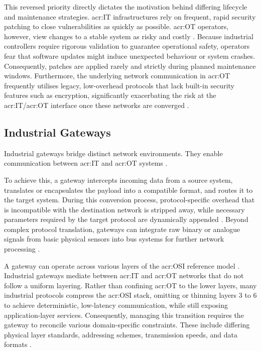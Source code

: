 This reversed priority directly dictates the motivation behind differing lifecycle and maintenance strategies. \gls{acr:IT} infrastructures rely on frequent, rapid security patching to close vulnerabilities as quickly as possible. \gls{acr:OT} operators, however, view changes to a stable system as risky and costly \cite{orise2025itotconvergence}. Because industrial controllers require rigorous validation to guarantee operational safety, operators fear that software updates might induce unexpected behaviour or system crashes. Consequently, patches are applied rarely and strictly during planned maintenance windows. Furthermore, the underlying network communication in \gls{acr:OT} frequently utilises legacy, low-overhead protocols that lack built-in security features such as encryption, significantly exacerbating the risk at the \gls{acr:IT}/\gls{acr:OT} interface once these networks are converged \cite{hwi_ot_definition}.

\subsection{Industrial Gateways} 
\label{subsec:architectural_role_gateways}

Industrial gateways bridge distinct network environments. They enable communication between \gls{acr:IT} and \gls{acr:OT} systems \cite{elektronikkompendium_gateway}.

To achieve this, a gateway intercepts incoming data from a source system, translates or encapsulates the payload into a compatible format, and routes it to the target system. During this conversion process, protocol-specific overhead that is incompatible with the destination network is stripped away, while necessary parameters required by the target protocol are dynamically appended \cite[p. 277]{Gsell2026}.
Beyond complex protocol translation, gateways can integrate raw binary or analogue signals from basic physical sensors into bus systems for further network processing \cite[p. 132]{Babel2024}\cite{kleinbongartz2008uebersetzer} .

A gateway can operate across various layers of the \gls{acr:OSI} reference model \cite{elektronikkompendium_gateway}. Industrial gateways mediate between \gls{acr:IT} and \gls{acr:OT} networks that do not follow a uniform layering. Rather than confining \gls{acr:OT} to the lower layers, many industrial protocols compress the \gls{acr:OSI} stack, omitting or thinning layers 3 to 6 to achieve deterministic, low-latency communication, while still exposing application-layer services. Consequently, managing this transition requires the gateway to reconcile various domain-specific constraints. These include differing physical layer standards, addressing schemes, transmission speeds, and data formats \cite{elektronikkompendium_gateway}. 

